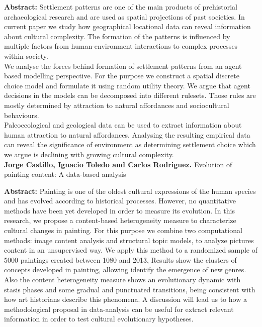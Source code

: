 \documentclass[]{article}
\begin{document}
\textbf{Abstract:} Settlement patterns are one of the main products of
prehistorial archaeological research and are used as spatial projections
of past societies. In current paper we study how geographical locational
data can reveal information about cultural complexity. The formation of
the patterns is influenced by multiple factors from human-environment
interactions to complex processes within society.\\
We analyse the forces behind formation of settlement patterns from an
agent based modelling perspective. For the purpose we construct a
spatial discrete choice model and formulate it using random utility
theory. We argue that agent decisions in the models can be decomposed
into different rulesets. Those rules are mostly determined by attraction
to natural affordances and sociocultural behaviours.\\
Paleoecological and geological data can be used to extract information
about human attraction to natural affordances. Analysing the resulting
empirical data can reveal the significance of environment as determining
settlement choice which we argue is declining with growing cultural
complexity.\\

{\bf {Jorge Castillo, Ignacio Toledo and Carlos Rodriguez}. }{Evolution of
painting content: A data-based analysis }

\textbf{Abstract:} Painting is one of the oldest cultural expressions of
the human species and has evolved according to historical processes.
However, no quantitative methods have been yet developed in order to
measure its evolution. In this research, we propose a content-based
heterogeneity measure to characterize cultural changes in painting. For
this purpose we combine two computational methods: image content
analysis and structural topic models, to analyze pictures content in an
unsupervised way. We apply this method to a randomized sample of\\
5000 paintings created between 1080 and 2013, Results show the clusters
of concepts developed in painting, allowing identify the emergence of
new genres. Also the content heterogeneity measure shows an evolutionary
dynamic with stasis phases and some gradual and punctuated transitions,
being consistent with how art historians describe this phenomena. A
discussion will lead us to how a methodological proposal in
data-analysis can be useful for extract relevant information in order to
test cultural evolutionary hypotheses.
\end{document}

